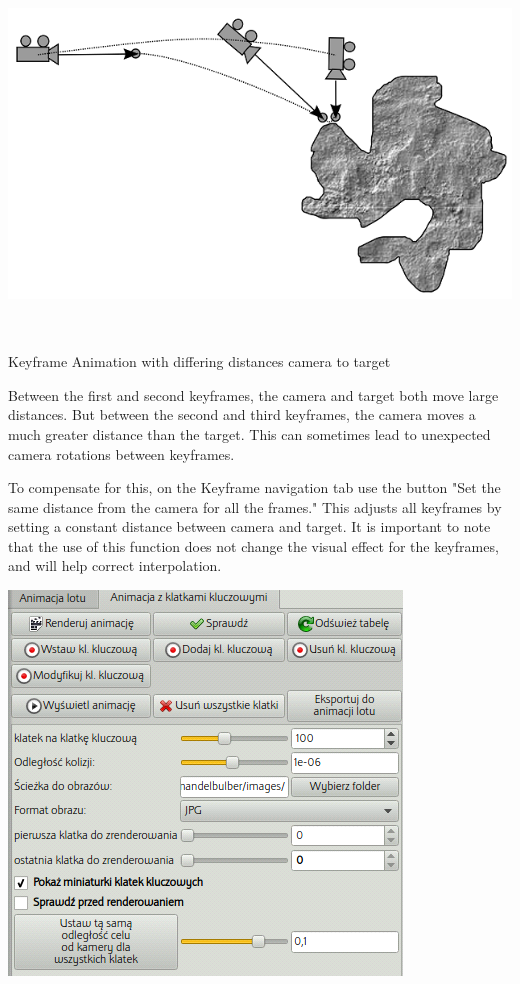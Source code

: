 \includegraphics[width=6.52292in,height=3.75556in]{img/manual/media/image18.png}

Keyframe Animation with differing distances camera to target

Between the first and second keyframes, the camera and target both move large
distances. But between the second and third keyframes, the camera moves a much
greater distance than the target. This can sometimes lead to unexpected camera
rotations between keyframes.

To compensate for this, on the Keyframe navigation tab use the button "Set the
same distance from the camera for all the frames." This adjusts all keyframes by
setting a constant distance between camera and target. It is important to note
that the use of this function does not change the visual effect for the
keyframes, and will help correct interpolation.

\includegraphics[width=4.11597in,height=4.02292in]{img/manual/media/image19.png}
